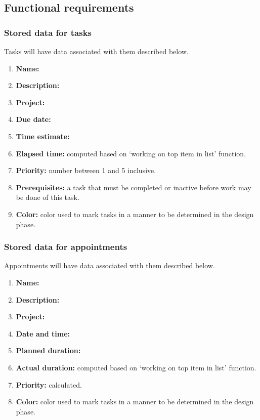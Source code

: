 \documentclass[12pt,a4paper]{article}
\begin{document}

\subsection{Functional requirements}
\subsubsection{Stored data for tasks}
Tasks will have data associated with them described below.
\begin{enumerate}
\item \textbf{Name:}
\item \textbf{Description:}
\item \textbf{Project:}
\item \textbf{Due date:}
\item \textbf{Time estimate:}
\item \textbf{Elapsed time:} computed based on `working on top item in list' function.
\item \textbf{Priority:} number between 1 and 5 inclusive.
\item \textbf{Prerequisites:} a task that must be completed or inactive before work may be done of this task.
\item \textbf{Color:} color used to mark tasks in a manner to be determined in the design phase.
\end{enumerate}

\subsubsection{Stored data for appointments}
Appointments will have data associated with them described below.
\begin{enumerate}
\item \textbf{Name:}
\item \textbf{Description:}
\item \textbf{Project:}
\item \textbf{Date and time:}
\item \textbf{Planned duration:}
\item \textbf{Actual duration:} computed based on `working on top item in list' function.
\item \textbf{Priority:} calculated.
\item \textbf{Color:} color used to mark tasks in a manner to be determined in the design phase.
\end{enumerate}
\end{document}
